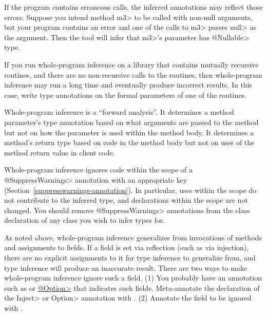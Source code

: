 If the program contains erroneous calls, the
inferred annotations may reflect those errors.
Suppose you intend method \<m3> to be called with
non-null arguments, but your program contains an error and one of the calls
to \<m3> passes \<null> as the argument.  Then the tool will infer that
\<m3>'s parameter has \<@Nullable> type.

If you run whole-program inference on a library that contains mutually
recursive routines, and there are no non-recursive calls to the routines,
then whole-program inference may run a long time and eventually produce
incorrect results.  In this case, write type annotations on the formal
parameters of one of the routines.

Whole-program inference is a ``forward analysis''.
It determines a method parameter's type
annotation based on what arguments are passed to the method but not on how the
parameter is used within the method body.
It determines a method's return type based on code in the method body but
not on uses of the method return value in client code.



Whole-program inference ignores code within the scope of a
\<@SuppressWarnings> annotation with an appropriate key
(Section~\ref{suppresswarnings-annotation}).  In particular, uses within
the scope do not contribute to the inferred type, and declarations within
the scope are not changed.  You should remove \<@SuppressWarnings> annotations
from the class declaration of any class you wish to infer types for.

As noted above, whole-program inference generalizes from invocations of methods and
assignments to fields.  If a field is set via
reflection (such as via injection), there are no explicit assignments to it
for type inference to generalize from, and type inference will produce
an inaccurate result.  There are two ways to make whole-program inference
ignore such a field.
%
(1)
You probably have an annotation such as
or
\href{https://types.cs.washington.edu/plume-lib/api/plume/Option.html}{\<@Option>}
that indicates such fields.  Meta-annotate the declaration of the \<Inject>
or \<Option> annotation with
.
%
(2)
Annotate the field to be ignored with
.

